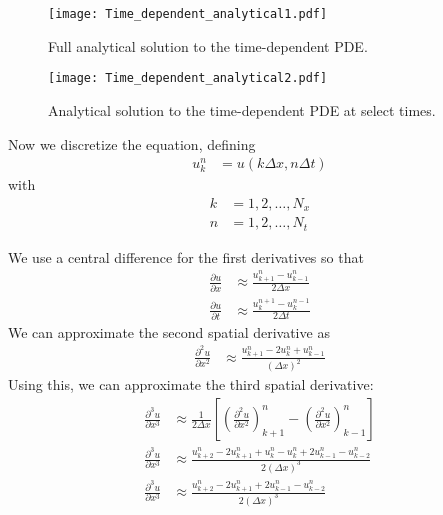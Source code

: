 \documentclass[twocolumn]{myarticle}
\numberwithin{equation}{section}
\begin{document}
\begin{figure}[ht]
    \centering
    \texttt{[image: Time\_dependent\_analytical1.pdf]}
    \caption{Full analytical solution to the time-dependent PDE.}
    \label{fig:time_dependent_analytical1}
\end{figure}

\begin{figure*}[ht]
    \centering
    \texttt{[image: Time\_dependent\_analytical2.pdf]}
    \caption{Analytical solution to the time-dependent PDE at select times.}
    \label{fig:time_dependent_analytical2}
\end{figure*}

Now we discretize the equation, defining
\begin{align}
    u^n_k &= u(k \Delta x, n \Delta t)
\end{align}
with
\begin{align}
    k &= 1, 2, \ldots, N_x
    \\
    n &= 1, 2, \ldots, N_t
\end{align}

We use a central difference for the first derivatives so that
\begin{align}
    \frac{\partial u}{\partial x} &\approx \frac{u^n_{k+1} - u^n_{k-1}}{2 \Delta x}
    \\
    \frac{\partial u}{\partial t} &\approx \frac{u^{n+1}_{k} - u^{n-1}_{k}}{2 \Delta t}
\end{align}
We can approximate the second spatial derivative as
\begin{align}
    \frac{\partial^2 u}{\partial x^2} &\approx \frac{u^n_{k+1} - 2 u^n_k + u^n_{k-1}}{(\Delta x)^2}
\end{align}
Using this, we can approximate the third spatial derivative:
\begin{align}
    \frac{\partial^3 u}{\partial x^3} &\approx \frac{1}{2 \Delta x} \left[ \left( \frac{\partial^2 u}{\partial x^2} \right)^n_{k+1} - \left( \frac{\partial^2 u}{\partial x^2} \right)^n_{k-1} \right]
    \\
    \frac{\partial^3 u}{\partial x^3} &\approx \frac{u^n_{k+2} - 2 u^n_{k+1} + u^n_k - u^n_k + 2u^n_{k-1} - u^n_{k-2}}{2 (\Delta x)^3}
    \\
    \frac{\partial^3 u}{\partial x^3} &\approx \frac{u^n_{k+2} - 2 u^n_{k+1} + 2u^n_{k-1} - u^n_{k-2}}{2 (\Delta x)^3}
\end{align}
\end{document}
